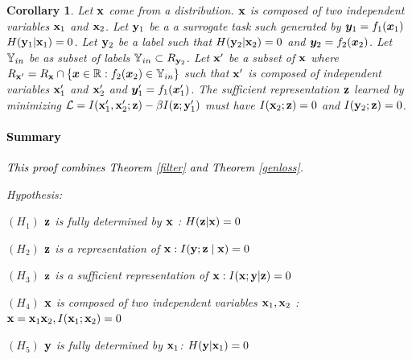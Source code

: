 \documentclass{article} %
\theoremstyle{plain}
\newtheorem{corollary}[theorem]{Corollary}
\theoremstyle{definition}
\theoremstyle{remark}
\begin{document}
\begin{corollary}

    Let ${\mathbf{x}}$ come from a distribution. ${\mathbf{x}}$ is composed of two independent variables ${\mathbf{x}}_1$ and ${\mathbf{x}}_2$. Let ${\mathbf{y}}_1$ be a a surrogate task such generated by ${\bm{y}}_1 = f_1({\bm{x}}_1)$ $H({\mathbf{y}}_1|{\mathbf{x}}_1) = 0$. Let ${\mathbf{y}}_2$ be a label such that $H({\mathbf{y}}_2|{\mathbf{x}}_2) = 0$ and ${\bm{y}}_2 = f_2({\bm{x}}_2)$. Let ${\mathbb{Y}}_{in}$ be as subset of labels ${\mathbb{Y}}_{in} \subset R_{{\mathbf{y}}_2}$. Let ${\mathbf{x}}'$ be a subset of ${\mathbf{x}}$ where $R_{{\mathbf{x}}'} =  R_{{\mathbf{x}}} \cap \{{\bm{x}} \in \mathbb{R}: f_2({\bm{x}}_2) \in {\mathbb{Y}}_{in} \}  $ such that ${\mathbf{x}}'$ is composed of independent variables ${\mathbf{x}}_1'$ and ${\mathbf{x}}_2'$ and ${\bm{y}}_1' = f_1({\bm{x}}_1')$. The sufficient representation ${\mathbf{z}}$ learned by minimizing $\mathcal{L} = I({\mathbf{x}}_1', {\mathbf{x}}_2'; {\mathbf{z}}) - \beta I({\mathbf{z}};{\mathbf{y}}_1')$ must have $I({\mathbf{x}}_2;{\mathbf{z}}) = 0$ and $I({\mathbf{y}}_2;{\mathbf{z}}) = 0$.


\textcolor{black}{\paragraph{Summary} This proof combines Theorem \ref{filter} and Theorem \ref{genloss}.}


Hypothesis: 

$(H_1)$  ${\mathbf{z}}$ is fully determined by ${\mathbf{x}}$ : $H({\mathbf{z}}|{\mathbf{x}}) = 0$

$(H_2)$  ${\mathbf{z}}$ is a representation of ${\mathbf{x}}: I({\mathbf{y}} ; {\mathbf{z}} \mid {\mathbf{x}})=0$

$(H_3)$  ${\mathbf{z}}$ is a sufficient representation of ${\mathbf{x}}: I({\mathbf{x}} ; {\mathbf{y}} | {\mathbf{z}})=0$

$(H_4)$ ${\mathbf{x}}$ is composed of two independent variables ${\mathbf{x}}_1, {\mathbf{x}}_2$ : ${\mathbf{x}} = {\mathbf{x}}_1 {\mathbf{x}}_2, I({\mathbf{x}}_1 ; {\mathbf{x}}_2) = 0$

$(H_5)$ ${\mathbf{y}}$ is fully determined by ${\mathbf{x}}_1$: $H({\mathbf{y}}|{\mathbf{x}}_1) = 0$ 


\end{corollary}
\end{document}
